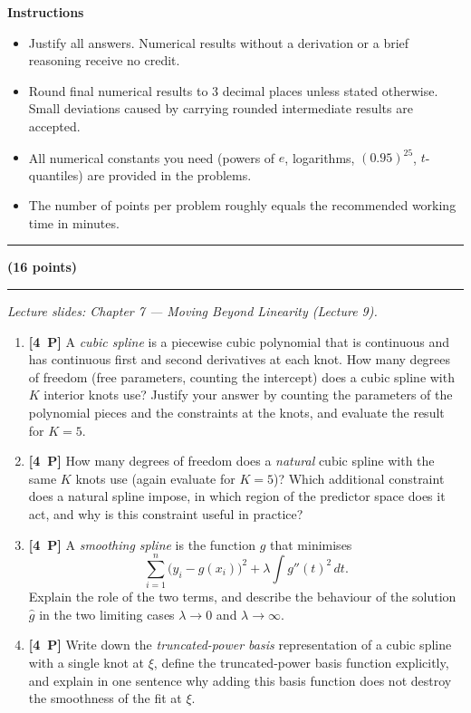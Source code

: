 \documentclass[11pt,a4paper]{article}
\newcommand{\problem}[2]{\par\vspace{7mm}\noindent{\large\textbf{Problem #1}}%
  \hfill{\large\textbf{(#2 points)}}\par\nopagebreak\vspace{0.6mm}%
  \noindent\rule{\textwidth}{0.6pt}\par\nopagebreak\vspace{2.5mm}}
\newcommand{\pp}[1]{\textbf{[#1~P]}\enspace}
\begin{document}
\vspace{2.5mm}
\textbf{Instructions}
\begin{itemize}[nosep,leftmargin=5.5mm]
  \item Justify all answers. Numerical results without a derivation or a brief reasoning receive no credit.
  \item Round final numerical results to 3 decimal places unless stated otherwise. Small deviations caused by carrying rounded intermediate results are accepted.
  \item All numerical constants you need (powers of $e$, logarithms, $(0.95)^{25}$, $t$-quantiles) are provided in the problems.
  \item The number of points per problem roughly equals the recommended working time in minutes.
\end{itemize}
\vspace{1mm}\noindent\rule{\textwidth}{0.6pt}

\problem{1: Moving beyond linearity --- splines}{16}
{\small\itshape Lecture slides: Chapter 7 --- Moving Beyond Linearity (Lecture 9).}\par\vspace{1mm}

\begin{enumerate}[label=(\alph*),leftmargin=7mm,itemsep=2.5mm]
  \item \pp{4} A \emph{cubic spline} is a piecewise cubic polynomial that is continuous and has
    continuous first and second derivatives at each knot. How many degrees of freedom (free
    parameters, counting the intercept) does a cubic spline with $K$ interior knots use?
    Justify your answer by counting the parameters of the polynomial pieces and the constraints
    at the knots, and evaluate the result for $K=5$.
  \item \pp{4} How many degrees of freedom does a \emph{natural} cubic spline with the same $K$
    knots use (again evaluate for $K=5$)? Which additional constraint does a natural spline
    impose, in which region of the predictor space does it act, and why is this constraint
    useful in practice?
  \item \pp{4} A \emph{smoothing spline} is the function $g$ that minimises
    \[
      \sum_{i=1}^{n}\bigl(y_i-g(x_i)\bigr)^2+\lambda\int g''(t)^2\,dt .
    \]
    Explain the role of the two terms, and describe the behaviour of the solution $\hat{g}$ in
    the two limiting cases $\lambda\to 0$ and $\lambda\to\infty$.
  \item \pp{4} Write down the \emph{truncated-power basis} representation of a cubic spline with
    a single knot at $\xi$, define the truncated-power basis function explicitly, and explain in
    one sentence why adding this basis function does not destroy the smoothness of the fit at
    $\xi$.
\end{enumerate}
\end{document}
